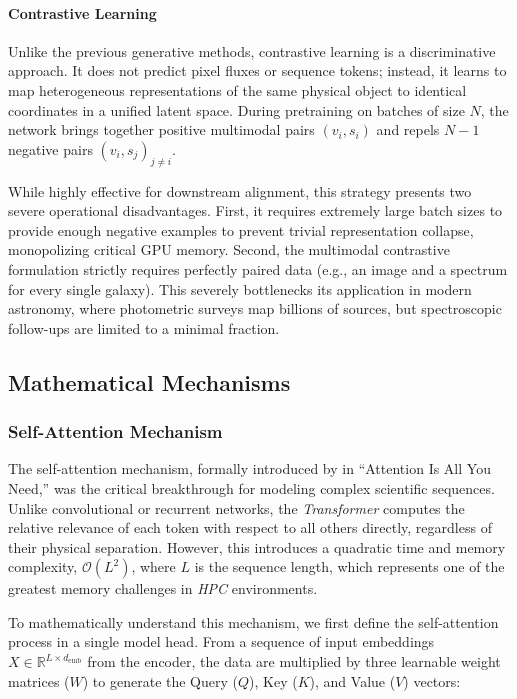 \paragraph{Contrastive Learning}
Unlike the previous generative methods, contrastive learning \autocite{ar:clip} is a discriminative approach. It does not predict pixel fluxes or sequence tokens; instead, it learns to map heterogeneous representations of the same physical object to identical coordinates in a unified latent space. During pretraining on batches of size $N$, the network brings together positive multimodal pairs $\left(v_i, s_i\right)$ and repels $N-1$ negative pairs $\left(v_i, s_j\right)_{j\neq i}$. 

While highly effective for downstream alignment, this strategy presents two severe operational disadvantages. First, it requires extremely large batch sizes to provide enough negative examples to prevent trivial representation collapse, monopolizing critical \gls{GPU} memory. Second, the multimodal contrastive formulation strictly requires perfectly paired data (e.g., an image and a spectrum for every single galaxy). This severely bottlenecks its application in modern astronomy, where photometric surveys map billions of sources, but spectroscopic follow-ups are limited to a minimal fraction.

\subsection{Mathematical Mechanisms} \label{sec:tb:math}

\subsubsection{Self-Attention Mechanism}

The self-attention mechanism, formally introduced by \textcite{ar:attention} in ``Attention Is All You Need,'' was the critical breakthrough for modeling complex scientific sequences. Unlike convolutional or recurrent networks, the \textit{Transformer} computes the relative relevance of each token with respect to all others directly, regardless of their physical separation. However, this introduces a quadratic time and memory complexity, $\mathcal{O}\left(L^2\right)$, where $L$ is the sequence length, which represents one of the greatest memory challenges in \textit{\gls{HPC}} environments.

To mathematically understand this mechanism, we first define the self-attention process in a single model head. From a sequence of input embeddings $X \in \mathbb{R}^{L \times d_{\text{emb}}}$ from the encoder, the data are multiplied by three learnable weight matrices ($W$) to generate the Query ($Q$), Key ($K$), and Value ($V$) vectors:

